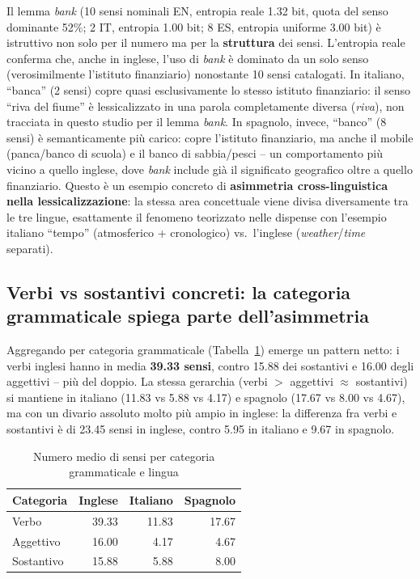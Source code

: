 \documentclass[12pt,a4paper]{article}
\begin{document}
Il lemma \textit{bank} (10 sensi nominali EN, entropia reale 1.32 bit, quota del senso dominante 52\%; 2 IT, entropia 1.00 bit; 8 ES, entropia uniforme 3.00 bit) \`e istruttivo non solo per il numero ma per la \textbf{struttura} dei sensi. L'entropia reale conferma che, anche in inglese, l'uso di \textit{bank} \`e dominato da un solo senso (verosimilmente l'istituto finanziario) nonostante 10 sensi catalogati. In italiano, ``banca'' (2 sensi) copre quasi esclusivamente lo stesso istituto finanziario: il senso ``riva del fiume'' \`e lessicalizzato in una parola completamente diversa (\textit{riva}), non tracciata in questo studio per il lemma \textit{bank}. In spagnolo, invece, ``banco'' (8 sensi) \`e semanticamente pi\`u carico: copre l'istituto finanziario, ma anche il mobile (panca/banco di scuola) e il banco di sabbia/pesci -- un comportamento pi\`u vicino a quello inglese, dove \textit{bank} include gi\`a il significato geografico oltre a quello finanziario. Questo \`e un esempio concreto di \textbf{asimmetria cross-linguistica nella lessicalizzazione}: la stessa area concettuale viene divisa diversamente tra le tre lingue, esattamente il fenomeno teorizzato nelle dispense con l'esempio italiano ``tempo'' (atmosferico + cronologico) vs.\ l'inglese (\textit{weather}/\textit{time} separati).

\subsection{Verbi vs sostantivi concreti: la categoria grammaticale spiega parte dell'asimmetria}

Aggregando per categoria grammaticale (Tabella~\ref{tab:categoria}) emerge un pattern netto: i verbi inglesi hanno in media \textbf{39.33 sensi}, contro 15.88 dei sostantivi e 16.00 degli aggettivi -- pi\`u del doppio. La stessa gerarchia (verbi $>$ aggettivi $\approx$ sostantivi) si mantiene in italiano (11.83 vs 5.88 vs 4.17) e spagnolo (17.67 vs 8.00 vs 4.67), ma con un divario assoluto molto pi\`u ampio in inglese: la differenza fra verbi e sostantivi \`e di 23.45 sensi in inglese, contro 5.95 in italiano e 9.67 in spagnolo.

\begin{table}[H]
  \centering
  \caption{Numero medio di sensi per categoria grammaticale e lingua}
  \label{tab:categoria}
  \begin{tabular}{lrrr}
    \toprule
    \textbf{Categoria} & \textbf{Inglese} & \textbf{Italiano} & \textbf{Spagnolo} \\
    \midrule
    Verbo      & 39.33 & 11.83 & 17.67 \\
    Aggettivo  & 16.00 &  4.17 &  4.67 \\
    Sostantivo & 15.88 &  5.88 &  8.00 \\
    \bottomrule
  \end{tabular}
\end{table}
\end{document}
